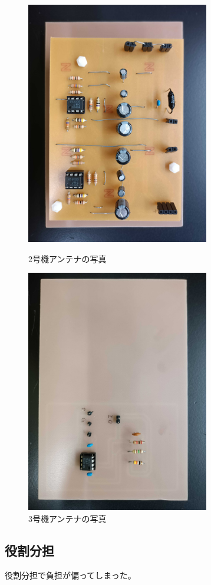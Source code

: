 \documentclass[report.tex]{subfiles}
\begin{document}
\begin{figure}[H]
	\begin{minipage}[b]{0.5\linewidth}
		\centering
		\includegraphics[width=8cm]{use/4.jpg}
		\caption{2号機アンテナの写真}
		\label{fig:s_6}
	\end{minipage}
	\begin{minipage}[b]{0.5\linewidth}
		\centering
		\includegraphics[width=8cm]{use/1.jpg}
		\caption{3号機アンテナの写真}
		\label{fig:s_7}
	\end{minipage}
\end{figure}

\subsection{役割分担}

役割分担で負担が偏ってしまった。
\end{document}

